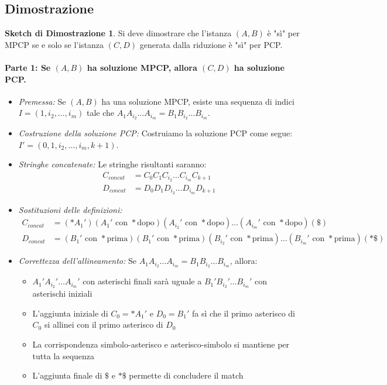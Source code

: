 \documentclass[a4paper]{article}
\theoremstyle{definition} %
\newtheorem{proof_sketch}{Sketch di Dimostrazione} %
\theoremstyle{remark} %
\begin{document}
\subsection{Dimostrazione}
\begin{proof_sketch}
Si deve dimostrare che l'istanza $(A, B)$ è "sì" per MPCP se e solo se l'istanza $(C, D)$ generata dalla riduzione è "sì" per PCP.

\paragraph{Parte 1: Se $(A, B)$ ha soluzione MPCP, allora $(C, D)$ ha soluzione PCP.}

\begin{itemize}
    \item \emph{Premessa:} Se $(A, B)$ ha una soluzione MPCP, esiste una sequenza di indici $I = (1, i_2, \dots, i_m)$ tale che $A_1 A_{i_2} \dots A_{i_m} = B_1 B_{i_2} \dots B_{i_m}$.
    
    \item \emph{Costruzione della soluzione PCP:} Costruiamo la soluzione PCP come segue: $I' = (0, 1, i_2, \dots, i_m, k+1)$.
    
    \item \emph{Stringhe concatenate:} Le stringhe risultanti saranno:
    \begin{align}
        C_{concat} &= C_0 C_1 C_{i_2} \dots C_{i_m} C_{k+1} \\
        D_{concat} &= D_0 D_1 D_{i_2} \dots D_{i_m} D_{k+1}
    \end{align}
    
    \item \emph{Sostituzioni delle definizioni:}
    \begin{align}
        C_{concat} &= (* A_1') (A_1' \text{ con } * \text{dopo}) (A_{i_2}' \text{ con } * \text{dopo}) \dots (A_{i_m}' \text{ con } * \text{dopo}) (\$) \\
        D_{concat} &= (B_1' \text{ con } * \text{prima}) (B_1' \text{ con } * \text{prima}) (B_{i_2}' \text{ con } * \text{prima}) \dots (B_{i_m}' \text{ con } * \text{prima}) (*\$)
    \end{align}
    
    \item \emph{Correttezza dell'allineamento:} Se $A_1 A_{i_2} \dots A_{i_m} = B_1 B_{i_2} \dots B_{i_m}$, allora:
    \begin{itemize}
        \item $A_1' A_{i_2}' \dots A_{i_m}'$ con asterischi finali sarà uguale a $B_1' B_{i_2}' \dots B_{i_m}'$ con asterischi iniziali
        \item L'aggiunta iniziale di $C_0 = *A_1'$ e $D_0 = B_1'$ fa sì che il primo asterisco di $C_0$ si allinei con il primo asterisco di $D_0$
        \item La corrispondenza simbolo-asterisco e asterisco-simbolo si mantiene per tutta la sequenza
        \item L'aggiunta finale di $\$$ e $*\$$ permette di concludere il match
    \end{itemize}
\end{itemize}


\end{proof_sketch}
\end{document}
